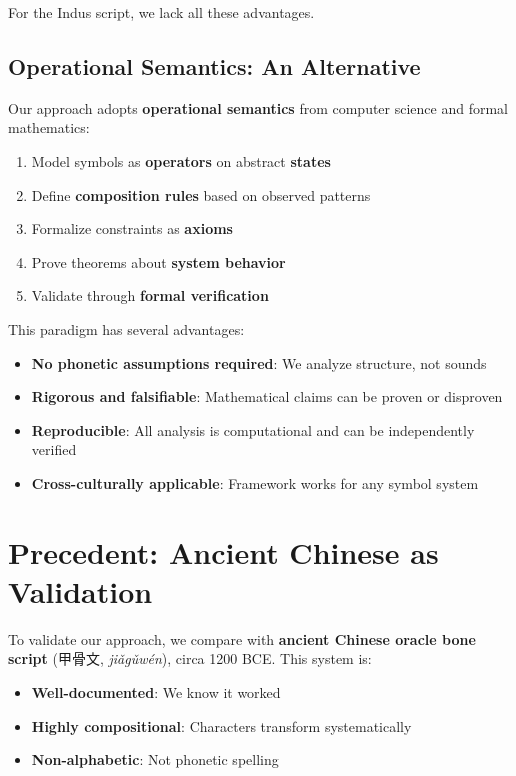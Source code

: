 For the Indus script, we lack all these advantages.

\subsection{Operational Semantics: An Alternative}

Our approach adopts \textbf{operational semantics} from computer science and formal mathematics:

\begin{enumerate}
    \item Model symbols as \textbf{operators} on abstract \textbf{states}
    \item Define \textbf{composition rules} based on observed patterns
    \item Formalize constraints as \textbf{axioms}
    \item Prove theorems about \textbf{system behavior}
    \item Validate through \textbf{formal verification}
\end{enumerate}

This paradigm has several advantages:

\begin{itemize}
    \item \textbf{No phonetic assumptions required}: We analyze structure, not sounds
    \item \textbf{Rigorous and falsifiable}: Mathematical claims can be proven or disproven
    \item \textbf{Reproducible}: All analysis is computational and can be independently verified
    \item \textbf{Cross-culturally applicable}: Framework works for any symbol system
\end{itemize}

\section{Precedent: Ancient Chinese as Validation}

To validate our approach, we compare with \textbf{ancient Chinese oracle bone script} (甲骨文, \textit{jiǎgǔwén}), circa 1200 BCE. This system is:

\begin{itemize}
    \item \textbf{Well-documented}: We know it worked
    \item \textbf{Highly compositional}: Characters transform systematically
    \item \textbf{Non-alphabetic}: Not phonetic spelling
\end{itemize}

